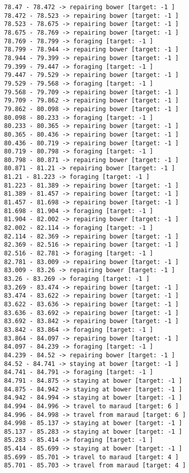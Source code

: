 \documentclass[11pt]{article}
\begin{document}
\begin{Verbatim}[commandchars=\\\{\}]
78.47 - 78.472 -> repairing bower [target: -1 ]
78.472 - 78.523 -> repairing bower [target: -1 ]
78.523 - 78.675 -> repairing bower [target: -1 ]
78.675 - 78.769 -> repairing bower [target: -1 ]
78.769 - 78.799 -> foraging [target: -1 ]
78.799 - 78.944 -> repairing bower [target: -1 ]
78.944 - 79.399 -> repairing bower [target: -1 ]
79.399 - 79.447 -> foraging [target: -1 ]
79.447 - 79.529 -> repairing bower [target: -1 ]
79.529 - 79.568 -> foraging [target: -1 ]
79.568 - 79.709 -> repairing bower [target: -1 ]
79.709 - 79.862 -> repairing bower [target: -1 ]
79.862 - 80.098 -> repairing bower [target: -1 ]
80.098 - 80.233 -> foraging [target: -1 ]
80.233 - 80.365 -> repairing bower [target: -1 ]
80.365 - 80.436 -> repairing bower [target: -1 ]
80.436 - 80.719 -> repairing bower [target: -1 ]
80.719 - 80.798 -> foraging [target: -1 ]
80.798 - 80.871 -> repairing bower [target: -1 ]
80.871 - 81.21 -> repairing bower [target: -1 ]
81.21 - 81.223 -> foraging [target: -1 ]
81.223 - 81.389 -> repairing bower [target: -1 ]
81.389 - 81.457 -> repairing bower [target: -1 ]
81.457 - 81.698 -> repairing bower [target: -1 ]
81.698 - 81.904 -> foraging [target: -1 ]
81.904 - 82.002 -> repairing bower [target: -1 ]
82.002 - 82.114 -> foraging [target: -1 ]
82.114 - 82.369 -> repairing bower [target: -1 ]
82.369 - 82.516 -> repairing bower [target: -1 ]
82.516 - 82.781 -> foraging [target: -1 ]
82.781 - 83.009 -> repairing bower [target: -1 ]
83.009 - 83.26 -> repairing bower [target: -1 ]
83.26 - 83.269 -> foraging [target: -1 ]
83.269 - 83.474 -> repairing bower [target: -1 ]
83.474 - 83.622 -> repairing bower [target: -1 ]
83.622 - 83.636 -> repairing bower [target: -1 ]
83.636 - 83.692 -> repairing bower [target: -1 ]
83.692 - 83.842 -> repairing bower [target: -1 ]
83.842 - 83.864 -> foraging [target: -1 ]
83.864 - 84.097 -> repairing bower [target: -1 ]
84.097 - 84.239 -> foraging [target: -1 ]
84.239 - 84.52 -> repairing bower [target: -1 ]
84.52 - 84.741 -> staying at bower [target: -1 ]
84.741 - 84.791 -> foraging [target: -1 ]
84.791 - 84.875 -> staying at bower [target: -1 ]
84.875 - 84.942 -> staying at bower [target: -1 ]
84.942 - 84.994 -> staying at bower [target: -1 ]
84.994 - 84.996 -> travel to maraud [target: 6 ]
84.996 - 84.998 -> travel from maraud [target: 6 ]
84.998 - 85.137 -> staying at bower [target: -1 ]
85.137 - 85.283 -> staying at bower [target: -1 ]
85.283 - 85.414 -> foraging [target: -1 ]
85.414 - 85.699 -> staying at bower [target: -1 ]
85.699 - 85.701 -> travel to maraud [target: 4 ]
85.701 - 85.703 -> travel from maraud [target: 4 ]

\end{Verbatim}
\end{document}
